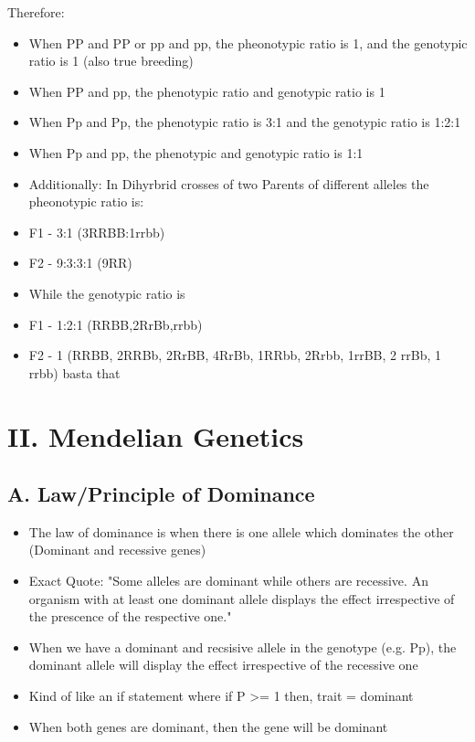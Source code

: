 \documentclass{article}
\begin{document}
Therefore: \break
\begin{itemize}
    \item When PP and PP or pp and pp, the pheonotypic ratio is 1, and the genotypic ratio is 1 (also true breeding)
    \item When PP and pp, the phenotypic ratio and genotypic ratio is 1
    \item When Pp and Pp, the phenotypic ratio is 3:1 and the genotypic ratio is 1:2:1
    \item When Pp and pp, the phenotypic and genotypic ratio is 1:1
    \item Additionally: In Dihyrbrid crosses of two Parents of different alleles the pheonotypic ratio is:
    \item F1 - 3:1 (3RRBB:1rrbb)
    \item F2 - 9:3:3:1 (9RR)
    \item While the genotypic ratio is
    \item F1 - 1:2:1 (RRBB,2RrBb,rrbb)
    \item F2 - 1 (RRBB, 2RRBb, 2RrBB, 4RrBb, 1RRbb, 2Rrbb, 1rrBB, 2 rrBb, 1 rrbb) basta that
\end{itemize}

\section*{II. Mendelian Genetics}
\subsection*{A. Law/Principle of Dominance}

\begin{itemize}
    \item The law of dominance is when there is one allele which dominates the other (Dominant and recessive genes)
    \item Exact Quote: "Some alleles are dominant while others are recessive. An organism with at least one dominant allele displays the effect irrespective of the prescence of the respective one."
    \item When we have a dominant and recsisive allele in the genotype (e.g. Pp), the dominant allele will display the effect irrespective of the recessive one
    \item Kind of like an if statement where if P >= 1 then, trait = dominant
    \item When both genes are dominant, then the gene will be dominant
\end{itemize}
\end{document}
